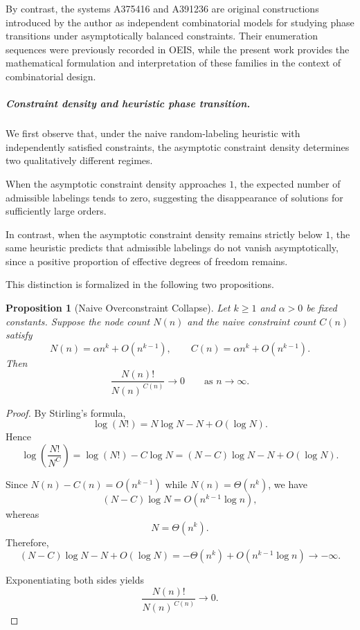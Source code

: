 \documentclass[11pt]{article}
\theoremstyle{plain}
\newtheorem{proposition}[theorem]{Proposition}
\theoremstyle{definition}
\begin{document}
By contrast, the systems A375416 and A391236 are original constructions
introduced by the author as independent combinatorial models for studying
phase transitions under asymptotically balanced constraints. Their
enumeration sequences were previously recorded in OEIS, while the present
work provides the mathematical formulation and interpretation of these
families in the context of combinatorial design.

\subparagraph{Constraint density and heuristic phase transition.}
We first observe that, under the naive random-labeling heuristic with 
independently satisfied constraints, the asymptotic constraint density 
determines two qualitatively different regimes.

When the asymptotic constraint density approaches $1$, the expected number 
of admissible labelings tends to zero, suggesting the disappearance of 
solutions for sufficiently large orders.

In contrast, when the asymptotic constraint density remains strictly below 
$1$, the same heuristic predicts that admissible labelings do not vanish 
asymptotically, since a positive proportion of effective degrees of freedom 
remains.

This distinction is formalized in the following two propositions.

\begin{proposition}[Naive Overconstraint Collapse]
Let $k \ge 1$ and $\alpha > 0$ be fixed constants. 
Suppose the node count $N(n)$ and the naive constraint count $C(n)$ satisfy
\[
N(n) = \alpha n^k + O(n^{k-1}), 
\qquad
C(n) = \alpha n^k + O(n^{k-1}).
\]
Then
\[
\frac{N(n)!}{N(n)^{\,C(n)}} \longrightarrow 0
\qquad \text{as } n \to \infty.
\]
\end{proposition}

\begin{proof}
By Stirling's formula,
\[
\log(N!) = N \log N - N + O(\log N).
\]
Hence
\[
\log\!\left(\frac{N!}{N^{C}}\right)
=
\log(N!) - C \log N
=
(N-C)\log N - N + O(\log N).
\]

Since $N(n) - C(n) = O(n^{k-1})$ while 
$N(n) = \Theta(n^k)$, we have
\[
(N-C)\log N = O(n^{k-1}\log n),
\]
whereas
\[
N = \Theta(n^k).
\]
Therefore,
\[
(N-C)\log N - N + O(\log N)
=
-\Theta(n^k) + O(n^{k-1}\log n)
\longrightarrow -\infty.
\]

Exponentiating both sides yields
\[
\frac{N(n)!}{N(n)^{\,C(n)}} \longrightarrow 0.
\]
\end{proof}
\end{document}
